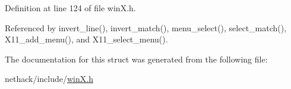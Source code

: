 Definition at line 124 of file win\+X.\+h.



Referenced by invert\+\_\+line(), invert\+\_\+match(), menu\+\_\+select(), select\+\_\+match(), X11\+\_\+add\+\_\+menu(), and X11\+\_\+select\+\_\+menu().



The documentation for this struct was generated from the following file\+:\begin{DoxyCompactItemize}
\item 
nethack/include/\hyperlink{winX_8h}{win\+X.\+h}\end{DoxyCompactItemize}

